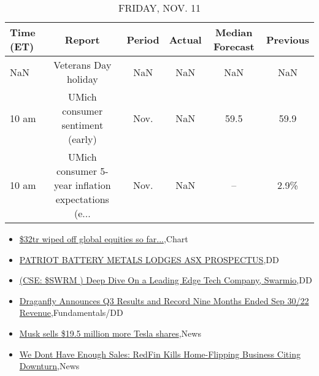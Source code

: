 \documentclass{article}%
\begin{document}
%


\begin{table}[htbp]%
\caption{FRIDAY, NOV. 11}%
\centering%
\begin{adjustbox}{width=1\textwidth}%
\begin{tabular}{lccccc}
\toprule
Time (ET) &                                             Report & Period & Actual & Median Forecast & Previous \\
\midrule
      NaN &                               Veterans Day holiday &    NaN &    NaN &             NaN &      NaN \\
    10 am &                   UMich consumer sentiment (early) &   Nov. &    NaN &            59.5 &     59.9 \\
    10 am & UMich consumer 5-year inflation expectations (e... &   Nov. &    NaN &              -- &     2.9\% \\
\bottomrule
\end{tabular}
%
\end{adjustbox}%
\end{table}

%
\begin{itemize}%
\item%
\href{https://reddit.com/r/wallstreetbets/comments/yrcmlj/32tr\_wiped\_off\_global\_equities\_so\_far/}{\$32tr wiped off global equities so far...},Chart%
\item%
\href{https://reddit.com/r/Baystreetbets/comments/yql3y7/patriot\_battery\_metals\_lodges\_asx\_prospectus/}{PATRIOT BATTERY METALS LODGES ASX PROSPECTUS},DD%
\item%
\href{https://reddit.com/r/Baystreetbets/comments/yqjsla/cse\_swrm\_deep\_dive\_on\_a\_leading\_edge\_tech\_company/}{(CSE: \$SWRM ) Deep Dive On a Leading Edge Tech Company, Swarmio},DD%
\item%
\href{https://reddit.com/r/StockMarket/comments/yrd3c0/draganfly\_announces\_q3\_results\_and\_record\_nine/}{Draganfly Announces Q3 Results and Record Nine Months Ended Sep 30/22 Revenue},Fundamentals/DD%
\item%
\href{https://reddit.com/r/Economics/comments/yrbmmm/musk\_sells\_195\_million\_more\_tesla\_shares/}{Musk sells \$19.5 million more Tesla shares},News%
\item%
\href{https://reddit.com/r/Economics/comments/yr7a7y/we\_dont\_have\_enough\_sales\_redfin\_kills/}{We Dont Have Enough Sales: RedFin Kills Home-Flipping Business Citing Downturn},News%
\end{itemize}%
\end{document}

